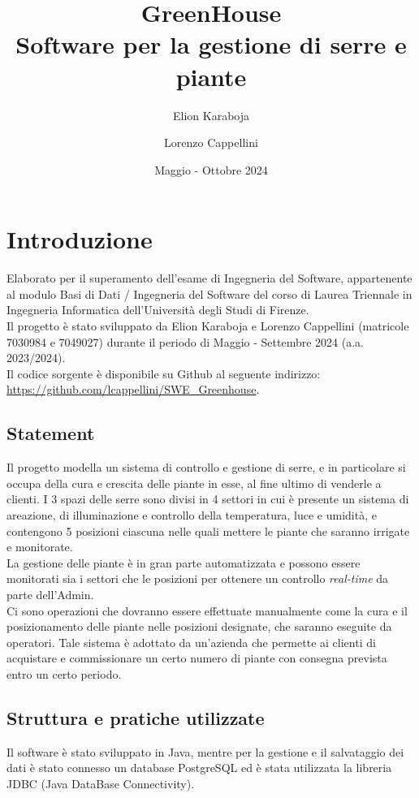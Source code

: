 \documentclass{article}
\title{GreenHouse \\ \vspace{0.5cm} {Software per la gestione di serre e piante}}
\author{Elion Karaboja \\ \and Lorenzo Cappellini}
\date{Maggio - Ottobre 2024}
\begin{document}


\tableofcontents

\newpage
\section{Introduzione}
Elaborato per il superamento dell’esame di Ingegneria del Software, appartenente al modulo Basi di Dati / Ingegneria del Software del corso di Laurea Triennale in Ingegneria Informatica dell’Università degli Studi di Firenze.
\\

\noindent Il progetto è stato sviluppato da Elion Karaboja e Lorenzo Cappellini (matricole 7030984 e 7049027) durante il periodo di Maggio - Settembre 2024 (a.a. 2023/2024).
\\

\noindent Il codice sorgente è disponibile su Github al seguente indirizzo:\\ 
\href{https://github.com/lcappellini/SWE_Greenhouse}{https://github.com/lcappellini/SWE\_Greenhouse}.

\subsection{Statement}
Il progetto modella un sistema di controllo e gestione di serre, e in particolare si occupa della cura e crescita delle piante in esse, al fine ultimo di venderle a clienti. 
I 3 spazi delle serre sono divisi in 4 settori in cui è presente un sistema di areazione, di illuminazione e controllo della temperatura, luce e umidità, e contengono 5 posizioni ciascuna nelle quali mettere le piante che saranno irrigate e monitorate. \\
La gestione delle piante è in gran parte automatizzata e possono essere monitorati sia i settori che le posizioni per ottenere un controllo \textit{real-time} da parte dell'Admin.\\ Ci sono operazioni che dovranno essere effettuate manualmente come la cura e il posizionamento delle piante nelle posizioni designate, che saranno eseguite da operatori. Tale sistema è adottato da un'azienda che permette ai clienti di acquistare e commissionare un certo numero di piante con consegna prevista entro un certo periodo.
\subsection{Struttura e pratiche utilizzate}
Il software è stato sviluppato in Java, mentre per la gestione e il salvataggio dei dati è stato connesso un database PostgreSQL ed è stata utilizzata la libreria JDBC (Java DataBase Connectivity).
\\
\end{document}
